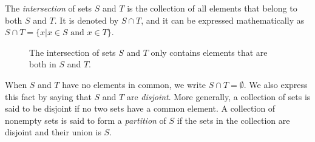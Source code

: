 The \emph{intersection} of sets $S$ and $T$ is the collection of all elements that belong to both $S$ and $T$.
It is denoted by $S \cap T$, and it can be expressed mathematically as $S \cap T = \{ x | x \in S \text{ and } x \in T \}$.

\begin{figure}[htb!]
\begin{center}
\caption{The intersection of sets $S$ and $T$ only contains elements that are both in $S$ and $T$.}
\end{center}
\end{figure}

When $S$ and $T$ have no elements in common, we write $S \cap T = \emptyset$.
We also express this fact by saying that $S$ and $T$ are \emph{disjoint}.
More generally, a collection of sets is said to be disjoint if no two sets have a common element.
A collection of nonempty sets is said to form a \emph{partition} of $S$ if the sets in the collection are disjoint and their union is $S$.

